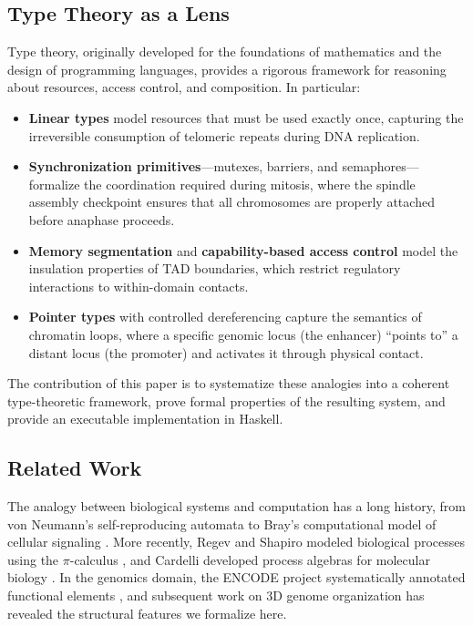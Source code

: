 \documentclass[12pt,a4paper]{article}
\theoremstyle{plain}
\theoremstyle{definition}
\begin{document}
\subsection{Type Theory as a Lens}

Type theory, originally developed for the foundations of mathematics and the design of programming languages, provides a rigorous framework for reasoning about resources, access control, and composition. In particular:

\begin{itemize}
  \item \textbf{Linear types} \cite{girard1987linear, wadler1990linear} model resources that must be used exactly once, capturing the irreversible consumption of telomeric repeats during DNA replication.
  \item \textbf{Synchronization primitives}---mutexes, barriers, and semaphores---formalize the coordination required during mitosis, where the spindle assembly checkpoint ensures that all chromosomes are properly attached before anaphase proceeds.
  \item \textbf{Memory segmentation} and \textbf{capability-based access control} model the insulation properties of TAD boundaries, which restrict regulatory interactions to within-domain contacts.
  \item \textbf{Pointer types} with controlled dereferencing capture the semantics of chromatin loops, where a specific genomic locus (the enhancer) ``points to'' a distant locus (the promoter) and activates it through physical contact.
\end{itemize}

The contribution of this paper is to systematize these analogies into a coherent type-theoretic framework, prove formal properties of the resulting system, and provide an executable implementation in Haskell.

\subsection{Related Work}

The analogy between biological systems and computation has a long history, from von Neumann's self-reproducing automata to Bray's computational model of cellular signaling \cite{bray1995protein}. More recently, Regev and Shapiro modeled biological processes using the $\pi$-calculus \cite{regev2001representation}, and Cardelli developed process algebras for molecular biology \cite{cardelli2005abstract}. In the genomics domain, the ENCODE project systematically annotated functional elements \cite{encode2012integrated}, and subsequent work on 3D genome organization \cite{dekker2013exploring} has revealed the structural features we formalize here.
\end{document}
